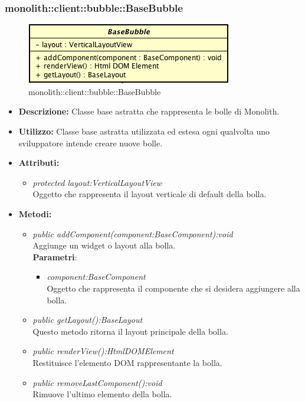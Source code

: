 \subsubsection{monolith::client::bubble::BaseBubble}

\label{monolith::client::bubble::BaseBubble}
\begin{figure}[H]
	\centering
	\includegraphics[scale=0.5]{Sezioni/SottosezioniST/img/BaseBubble.png}
	\caption{monolith::client::bubble::BaseBubble}
\end{figure}

\begin{itemize}
\item \textbf{Descrizione:} Classe base astratta che rappresenta le bolle di Monolith.
\item \textbf{Utilizzo:} Classe base astratta utilizzata ed estesa ogni qualvolta uno sviluppatore intende creare nuove bolle.
\item \textbf{Attributi:} 
\begin{itemize}
\item \textit{protected layout:VerticalLayoutView}\\
Oggetto che rappresenta il layout verticale di default della bolla.
\end{itemize}
\item \textbf{Metodi:}
\begin{itemize}
	\item \textit{public addComponent(component:BaseComponent):void}\\
Aggiunge un widget o layout alla bolla.
		  \\ \textbf{Parametri}: \begin{itemize}
				\item \textit{component:BaseComponent}\\
					Oggetto che rappresenta il componente che si desidera aggiungere alla bolla.
			\end{itemize}
	\item \textit{public getLayout():BaseLayout}\\
Questo metodo ritorna il layout principale della bolla.
	\item \textit{public renderView():HtmlDOMElement}\\
Restituisce l'elemento DOM rappresentante la bolla.
	\item \textit{public removeLastComponent():void}\\
Rimuove l'ultimo elemento della bolla.
\end{itemize}
\end{itemize}

